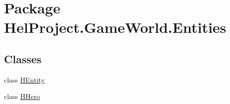 \hypertarget{namespace_hel_project_1_1_game_world_1_1_entities}{}\section{Package Hel\+Project.\+Game\+World.\+Entities}
\label{namespace_hel_project_1_1_game_world_1_1_entities}
\subsection*{Classes}
\begin{DoxyCompactItemize}
\item 
class \hyperlink{class_hel_project_1_1_game_world_1_1_entities_1_1_h_entity}{H\+Entity}
\item 
class \hyperlink{class_hel_project_1_1_game_world_1_1_entities_1_1_h_hero}{H\+Hero}
\end{DoxyCompactItemize}
